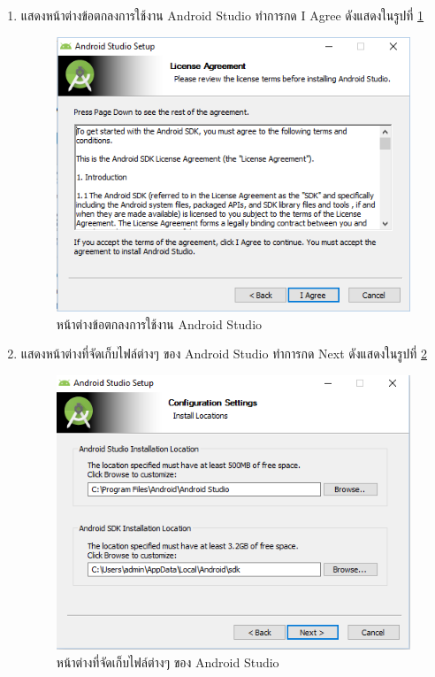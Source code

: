 \begin{enumerate}
	\item  แสดงหน้าต่างข้อตกลงการใช้งาน Android Studio ทำการกด  I Agree ดังแสดงในรูปที่ \ref{Fig:android4}
	\begin{figure}[H]
		\centering
		\includegraphics[width=0.7\columnwidth]{Figures/prepareation/android4}
		\caption{หน้าต่างข้อตกลงการใช้งาน  Android Studio}
		\label{Fig:android4}
	\end{figure}
	
	\item  แสดงหน้าต่างที่จัดเก็บไฟล์ต่างๆ ของ Android Studio ทำการกด Next ดังแสดงในรูปที่ \ref{Fig:android5}
	\begin{figure}[H]
		\centering
		\includegraphics[width=0.7\columnwidth]{Figures/prepareation/android5}
		\caption{หน้าต่างที่จัดเก็บไฟล์ต่างๆ ของ  Android Studio}
		\label{Fig:android5}
	\end{figure}
	

\end{enumerate}
